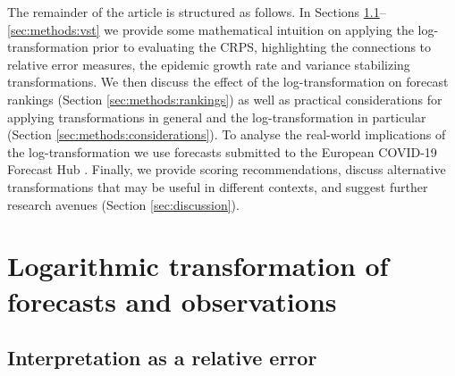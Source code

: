 \documentclass{article}
\begin{document}
The remainder of the article is structured as follows. In Sections \ref{sec:methods:relative}--\ref{sec:methods:vst} we provide some mathematical intuition on applying the log-transformation prior to evaluating the CRPS, highlighting the connections to relative error measures, the epidemic growth rate and variance stabilizing transformations.
We then discuss the effect of the log-transformation on forecast rankings (Section \ref{sec:methods:rankings}) as well as practical considerations for applying transformations in general and the log-transformation in particular (Section \ref{sec:methods:considerations}). To analyse the real-world implications of the log-transformation we use forecasts submitted to the European COVID-19 Forecast Hub  \citep[ Section \ref{sec:HUB}]{europeancovid-19forecasthubEuropeanCovid19Forecast2021, sherrattPredictivePerformanceMultimodel2022}. Finally, we provide scoring recommendations, discuss alternative transformations that may be useful in different contexts, and suggest further research avenues (Section \ref{sec:discussion}). 


\section{Logarithmic transformation of forecasts and observations}
\label{sec:methods}

\subsection{Interpretation as a relative error}
\label{sec:methods:relative}
\end{document}
